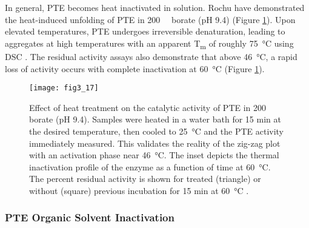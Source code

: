\begin{refsection}
In general, PTE becomes heat inactivated in solution. Rochu 
have demonstrated the heat-induced unfolding of PTE in
\SI{200}{\milli\Molar} borate (pH 9.4) \cite{Rochu2002b} (Figure
\ref{fig:pte-thermo-inactive}). Upon elevated temperatures, PTE undergoes
irreversible denaturation, leading to aggregates at high
temperatures with an apparent T\textsubscript{m} of roughly \SI{75}{\celsius}
using DSC \cite{Rochu2002b}.  The residual activity assays also demonstrate
that above \SI{46}{\celsius}, a rapid loss of activity occurs with complete
inactivation at \SI{60}{\celsius} (Figure \ref{fig:pte-thermo-inactive}).
\begin{figure}[h!] \centering \texttt{[image: fig3\_17]}
    \caption[Effect of heat treatment on the catalytic activity of PTE in
    \SI{200}{\milli\Molar} borate (pH 9.4). Samples were heated in a water bath
for 15 min at the desired temperature, then cooled to \SI{25}{\celsius} and the
PTE activity immediately measured. This validates the reality of the zig-zag
plot with an activation phase near \SI{46}{\celsius}. The inset depicts the
thermal inactivation profile of the enzyme as a function of time at
\SI{60}{\celsius}. The percent residual activity is shown for treated
(triangle) or without (square) previous incubation for 15 min at
\SI{60}{\celsius}.]{Effect of heat treatment on the catalytic activity of PTE
    in \SI{200}{\milli\Molar} borate (pH 9.4). Samples were heated in a water
    bath for 15 min at the desired temperature, then cooled to
    \SI{25}{\celsius} and the PTE activity immediately measured. This validates
    the reality of the zig-zag plot with an activation phase near
    \SI{46}{\celsius}. The inset depicts the thermal inactivation profile of
    the enzyme as a function of time at \SI{60}{\celsius}. The percent
    residual activity is shown for treated (triangle) or without (square)
    previous incubation for 15 min at \SI{60}{\celsius} \cite{Rochu2002b}.}
    \label{fig:pte-thermo-inactive} 
\end{figure}

\subsubsection{PTE Organic Solvent Inactivation}


\end{refsection}
